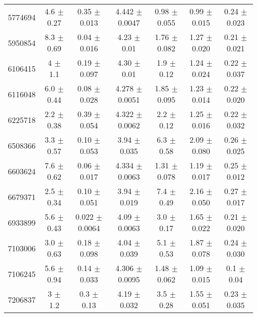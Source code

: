 \documentclass[epjCONF,columns]{svjour} %
\begin{document}
\begin{table*}
\begin{tabular}{c|cccccc}
5774694  &        4.6    $\pm$  0.27   &      0.35   $\pm$  0.013  &      4.442  $\pm$  0.0047 &      0.98   $\pm$  0.055  &      0.99   $\pm$  0.015  &      0.24   $\pm$  0.023    \\
5950854  &        8.3    $\pm$  0.69   &      0.04   $\pm$  0.016  &      4.23   $\pm$  0.01   &      1.76   $\pm$  0.082  &      1.27   $\pm$  0.020  &      0.21   $\pm$  0.021    \\
6106415  &        4      $\pm$  1.1    &      0.19   $\pm$  0.097  &      4.30   $\pm$  0.01   &      1.9    $\pm$  0.12   &      1.24   $\pm$  0.024  &      0.22   $\pm$  0.037    \\
6116048  &        6.0    $\pm$  0.44   &      0.08   $\pm$  0.028  &      4.278  $\pm$  0.0051 &      1.85   $\pm$  0.095  &      1.23   $\pm$  0.014  &      0.22   $\pm$  0.020    \\
6225718  &        2.2    $\pm$  0.38   &      0.39   $\pm$  0.054  &      4.322  $\pm$  0.0062 &      2.2    $\pm$  0.12   &      1.25   $\pm$  0.016  &      0.22   $\pm$  0.032    \\
6508366  &        3.3    $\pm$  0.57   &      0.10   $\pm$  0.053  &      3.94   $\pm$  0.035  &      6.3    $\pm$  0.58   &      2.09   $\pm$  0.080  &      0.26   $\pm$  0.025    \\
6603624  &        7.6    $\pm$  0.62   &      0.06   $\pm$  0.017  &      4.334  $\pm$  0.0063 &      1.31   $\pm$  0.078  &      1.19   $\pm$  0.017  &      0.25   $\pm$  0.012    \\
6679371  &        2.5    $\pm$  0.34   &      0.10   $\pm$  0.051  &      3.94   $\pm$  0.019  &      7.4    $\pm$  0.49   &      2.16   $\pm$  0.050  &      0.27   $\pm$  0.017    \\
6933899  &        5.6    $\pm$  0.43   &      0.022  $\pm$  0.0064 &      4.09   $\pm$  0.0063 &      3.0    $\pm$  0.17   &      1.65   $\pm$  0.022  &      0.21   $\pm$  0.020    \\
7103006  &        3.0    $\pm$  0.63   &      0.18   $\pm$  0.098  &      4.04   $\pm$  0.039  &      5.1    $\pm$  0.53   &      1.87   $\pm$  0.078  &      0.24   $\pm$  0.030    \\
7106245  &        5.6    $\pm$  0.94   &      0.14   $\pm$  0.033  &      4.306  $\pm$  0.0095 &      1.48   $\pm$  0.062  &      1.09   $\pm$  0.015  &      0.1    $\pm$  0.04     \\
7206837  &        3      $\pm$  1.2    &      0.3    $\pm$  0.13   &      4.19   $\pm$  0.032  &      3.5    $\pm$  0.28   &      1.55   $\pm$  0.051  &      0.23   $\pm$  0.035    \\

\end{tabular}
\end{table*}
\end{document}
